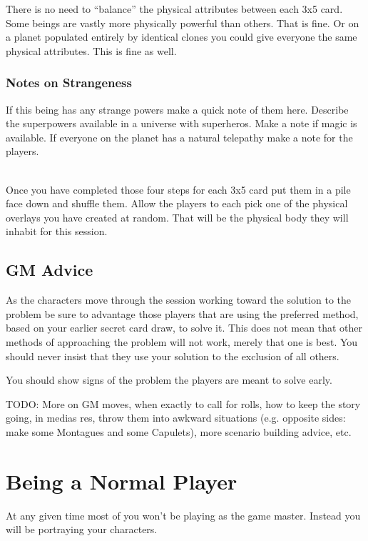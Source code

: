 \documentclass[letterpaper,12pt,landscape,twocolumn]{book}
\begin{document}
There is no need to ``balance'' the physical attributes between each
3x5 card. Some beings are vastly more physically powerful than
others. That is fine. Or on a planet populated entirely by identical
clones you could give everyone the same physical attributes. This is
fine as well.

\subsubsection{Notes on Strangeness}
If this being has any strange powers make a quick note of them
here. Describe the superpowers available in a universe with
superheros. Make a note if magic is available. If everyone on the
planet has a natural telepathy make a note for the players. 

~ \\

Once you have completed those four steps for each 3x5 card put them in
a pile face down and shuffle them. Allow the players to each pick one
of the physical overlays you have created at random. That will be the
physical body they will inhabit for this session.  

\subsection{GM Advice}

As the characters move through the session working toward the
solution to the problem be sure to advantage those players that are
using the preferred method, based on your earlier secret card draw, to
solve it. This does not mean that other methods of approaching the
problem will not work, merely that one is best. You should never
insist that they use your solution to the exclusion of all others.

You should show signs of the problem the players are meant to solve
early. 

TODO: More on GM moves, when exactly to call for rolls, how to keep
the story going, in medias res, throw them into awkward situations
(e.g. opposite sides: make some Montagues and some Capulets), more
scenario building advice, etc.

\section{Being a Normal Player}

At any given time most of you won't be playing as the game
master. Instead you will be portraying your characters. 
\end{document}

